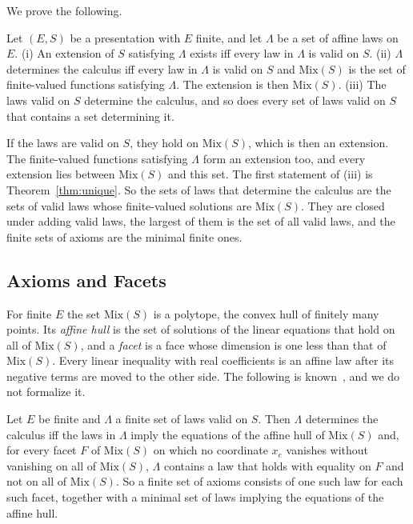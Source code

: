 \noindent
We prove the following.

\begin{theorem}
\label{thm:axioms-unique}
Let $(E, S)$ be a presentation with $E$ finite, and let $\Lambda$ be a
set of affine laws on $E$.
(i) An extension of $S$ satisfying $\Lambda$ exists iff every law in
$\Lambda$ is valid on $S$.
(ii) $\Lambda$ determines the calculus iff every law in $\Lambda$ is
valid on $S$ and $\mathrm{Mix}(S)$ is the set of finite-valued functions
satisfying $\Lambda$. The extension is then $\mathrm{Mix}(S)$.
(iii) The laws valid on $S$ determine the calculus, and so does every set
of laws valid on $S$ that contains a set determining it.
\end{theorem}

\noindent
If the laws are valid on $S$, they hold on $\mathrm{Mix}(S)$, which is
then an extension. The finite-valued functions satisfying $\Lambda$ form
an extension too, and every extension lies between $\mathrm{Mix}(S)$
and this set. The first statement of (iii) is Theorem~\ref{thm:unique}.
So the sets of laws that determine the calculus are the sets of valid
laws whose finite-valued solutions are $\mathrm{Mix}(S)$. They are closed
under adding valid laws, the largest of them is the set of all valid
laws, and the finite sets of axioms are the minimal finite ones.

\subsection{Axioms and Facets}
\label{sec:axioms-facets}

For finite $E$ the set $\mathrm{Mix}(S)$ is a polytope, the convex hull
of finitely many points. Its \emph{affine hull} is the set of solutions of
the linear equations that hold on all of $\mathrm{Mix}(S)$, and a
\emph{facet} is a face whose dimension is one less than that of
$\mathrm{Mix}(S)$. Every linear inequality with real coefficients is an
affine law after its negative terms are moved to the other side. The
following is known~\cite{ziegler1995}, and we do not formalize it.

\begin{theorem}
\label{thm:axioms-facets}
Let $E$ be finite and $\Lambda$ a finite set of laws valid on $S$. Then
$\Lambda$ determines the calculus iff the laws in $\Lambda$ imply the
equations of the affine hull of $\mathrm{Mix}(S)$ and, for every facet $F$
of $\mathrm{Mix}(S)$ on which no coordinate $x_e$ vanishes without
vanishing on all of $\mathrm{Mix}(S)$, $\Lambda$ contains a law that holds with equality on $F$ and not on all of
$\mathrm{Mix}(S)$. So a finite set of axioms consists of one such law for
each such facet, together with a minimal set of laws implying the
equations of the affine hull.
\end{theorem}

